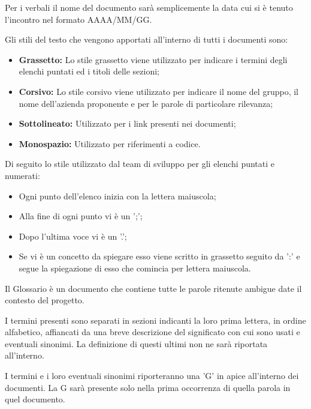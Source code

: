     Per i verbali il nome del documento sarà semplicemente la data cui si è tenuto l'incontro nel formato AAAA/MM/GG.


    Gli stili del testo che vengono apportati all’interno di tutti i documenti sono:

    \begin{itemize}
      \item \textbf{Grassetto:} Lo stile grassetto viene utilizzato per indicare i termini degli elenchi puntati ed i titoli delle sezioni;
      \item \textbf{Corsivo:} Lo stile corsivo viene utilizzato per indicare il nome del gruppo, il nome dell'azienda proponente e per le parole di particolare rilevanza;
      \item \textbf{Sottolineato:} Utilizzato per i link presenti nei documenti;
      \item \textbf{Monospazio:} Utilizzato per riferimenti a codice.
    \end{itemize}


    Di seguito lo stile utilizzato dal team di sviluppo per gli elenchi puntati e numerati:
    \begin{itemize}
      \item Ogni punto dell'elenco inizia con la lettera maiuscola;
      \item Alla fine di ogni punto vi è un ';';
      \item Dopo l'ultima voce vi è un '.';
      \item Se vi è un concetto da spiegare esso viene scritto in grassetto seguito da ':' e segue la spiegazione di esso che comincia per lettera maiuscola.
    \end{itemize}

    Il Glossario è un documento che contiene tutte le parole ritenute ambigue date il contesto del progetto.

    I termini presenti sono separati in sezioni indicanti la loro prima lettera, in ordine alfabetico, affiancati
    da una breve descrizione del significato con cui sono usati e eventuali sinonimi.
    La definizione di questi ultimi non ne sarà riportata all'interno.

    I termini e i loro eventuali sinonimi riporteranno una 'G' in apice all'interno dei documenti. La G sarà
    presente solo nella prima occorrenza di quella parola in quel documento.

